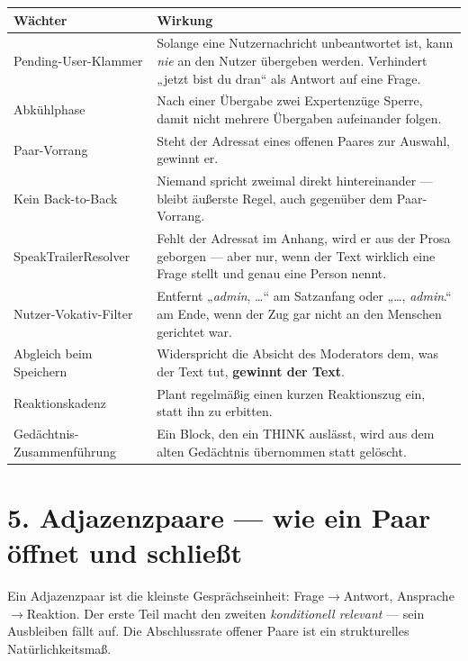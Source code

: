 \documentclass[11pt,a4paper]{article}
\newcommand{\code}[1]{{\ttfamily\small #1}}
\begin{document}
\begin{center}\sffamily\footnotesize
\begin{tabular}{@{}p{45mm}p{105mm}@{}}
\toprule
\textbf{Wächter} & \textbf{Wirkung} \\
\midrule
Pending-User-Klammer &
  Solange eine Nutzernachricht unbeantwortet ist, kann \emph{nie} an den Nutzer übergeben
  werden. Verhindert „jetzt bist du dran“ als Antwort auf eine Frage. \\
Abkühlphase &
  Nach einer Übergabe zwei Expertenzüge Sperre, damit nicht mehrere Übergaben
  aufeinander folgen. \\
Paar-Vorrang &
  Steht der Adressat eines offenen Paares zur Auswahl, gewinnt er. \\
Kein Back-to-Back &
  Niemand spricht zweimal direkt hintereinander --- bleibt äußerste Regel, auch
  gegenüber dem Paar-Vorrang. \\
\code{SpeakTrailerResolver} &
  Fehlt der Adressat im Anhang, wird er aus der Prosa geborgen --- aber nur, wenn der
  Text wirklich eine Frage stellt und genau eine Person nennt. \\
Nutzer-Vokativ-Filter &
  Entfernt „\emph{admin}, \dots“ am Satzanfang oder „\dots, \emph{admin}.“ am Ende, wenn
  der Zug gar nicht an den Menschen gerichtet war. \\
Abgleich beim Speichern &
  Widerspricht die Absicht des Moderators dem, was der Text tut, \textbf{gewinnt der Text}. \\
Reaktionskadenz &
  Plant regelmäßig einen kurzen Reaktionszug ein, statt ihn zu erbitten. \\
Gedächtnis-Zusammenführung &
  Ein Block, den ein THINK auslässt, wird aus dem alten Gedächtnis übernommen statt
  gelöscht. \\
\bottomrule
\end{tabular}
\end{center}

\clearpage
\section*{5. Adjazenzpaare --- wie ein Paar öffnet und schließt}

Ein Adjazenzpaar ist die kleinste Gesprächseinheit: Frage$\rightarrow$Antwort,
Ansprache$\rightarrow$Reaktion. Der erste Teil macht den zweiten \emph{konditionell
relevant} --- sein Ausbleiben fällt auf. Die Abschlussrate offener Paare ist ein
strukturelles Natürlichkeitsmaß.
\end{document}
